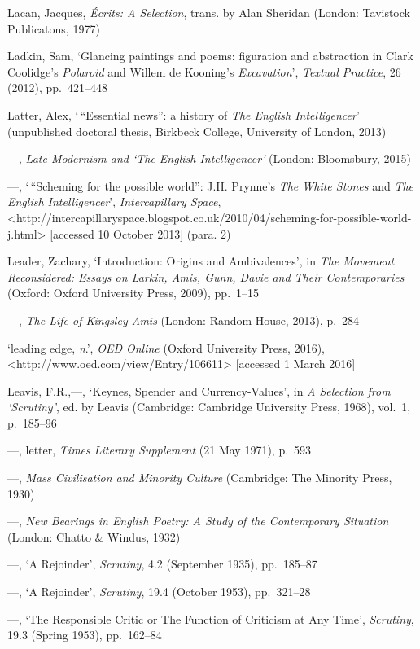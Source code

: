 \documentclass[]{article}
\begin{document}
Lacan, Jacques, \emph{Écrits: A Selection}, trans. by Alan Sheridan
(London: Tavistock Publicatons, 1977)

Ladkin, Sam, `Glancing paintings and poems: figuration and abstraction
in Clark Coolidge's \emph{Polaroid} and Willem de Kooning's
\emph{Excavation}', \emph{Textual Practice}, 26 (2012), pp.~421--448

Latter, Alex, `\,``Essential news'': a history of \emph{The English
Intelligencer}' (unpublished doctoral thesis, Birkbeck College,
University of London, 2013)

---, \emph{Late Modernism and `The English Intelligencer'} (London:
Bloomsbury, 2015)

---, `\,``Scheming for the possible world'': J.H. Prynne's \emph{The
White Stones} and \emph{The English Intelligencer}',
\emph{Intercapillary Space},\\
\textless{}http://intercapillaryspace.blogspot.co.uk/2010/04/scheming-for-possible-world-j.html\textgreater{}
{[}accessed 10 October 2013{]} (para. 2)

Leader, Zachary, `Introduction: Origins and Ambivalences', in \emph{The
Movement Reconsidered: Essays on Larkin, Amis, Gunn, Davie and Their
Contemporaries} (Oxford: Oxford University Press, 2009), pp.~1--15

---, \emph{The Life of Kingsley Amis} (London: Random House, 2013),
p.~284

`leading edge, \emph{n}.', \emph{OED Online} (Oxford University Press,
2016),\\
\textless{}http://www.oed.com/view/Entry/106611\textgreater{}
{[}accessed 1 March 2016{]}

Leavis, F.R.,---, `Keynes, Spender and Currency-Values', in \emph{A
Selection from `Scrutiny'}, ed. by Leavis (Cambridge: Cambridge
University Press, 1968), vol.~1, p.~185--96

---, letter, \emph{Times Literary Supplement} (21 May 1971), p.~593

---, \emph{Mass Civilisation and Minority Culture} (Cambridge: The
Minority Press, 1930)

---, \emph{New Bearings in English Poetry: A Study of the Contemporary
Situation} (London: Chatto \& Windus, 1932)

---, `A Rejoinder', \emph{Scrutiny}, 4.2 (September 1935), pp.~185--87

---, `A Rejoinder', \emph{Scrutiny}, 19.4 (October 1953), pp.~321--28

---, `The Responsible Critic or The Function of Criticism at Any Time',
\emph{Scrutiny}, 19.3 (Spring 1953), pp.~162--84
\end{document}
